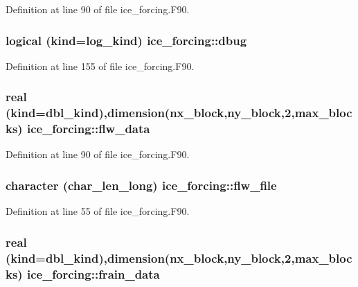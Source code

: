 Definition at line 90 of file ice\_\-forcing.F90.\hypertarget{namespaceice__forcing_a22e743605ad0e639e906f24289ef0cb1}{
\subsubsection[{dbug}]{\setlength{\rightskip}{0pt plus 5cm}logical (kind=log\_\-kind) {\bf ice\_\-forcing::dbug}}}
\label{namespaceice__forcing_a22e743605ad0e639e906f24289ef0cb1}


Definition at line 155 of file ice\_\-forcing.F90.\hypertarget{namespaceice__forcing_a22c2a2d054007cbf4c83142fba90a332}{
\subsubsection[{flw\_\-data}]{\setlength{\rightskip}{0pt plus 5cm}real (kind=dbl\_\-kind),dimension(nx\_\-block,ny\_\-block,2,max\_\-blocks) {\bf ice\_\-forcing::flw\_\-data}}}
\label{namespaceice__forcing_a22c2a2d054007cbf4c83142fba90a332}


Definition at line 90 of file ice\_\-forcing.F90.\hypertarget{namespaceice__forcing_a80a3c80bad2ac9ab38aff61fdaf8084e}{
\subsubsection[{flw\_\-file}]{\setlength{\rightskip}{0pt plus 5cm}character (char\_\-len\_\-long) {\bf ice\_\-forcing::flw\_\-file}}}
\label{namespaceice__forcing_a80a3c80bad2ac9ab38aff61fdaf8084e}


Definition at line 55 of file ice\_\-forcing.F90.\hypertarget{namespaceice__forcing_a33507a33e635005acfc8ac3fcb8f330d}{
\subsubsection[{frain\_\-data}]{\setlength{\rightskip}{0pt plus 5cm}real (kind=dbl\_\-kind),dimension(nx\_\-block,ny\_\-block,2,max\_\-blocks) {\bf ice\_\-forcing::frain\_\-data}}}
\label{namespaceice__forcing_a33507a33e635005acfc8ac3fcb8f330d}


